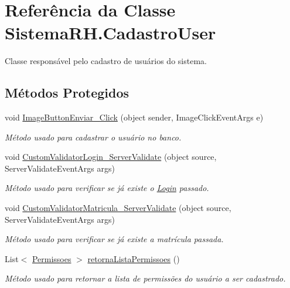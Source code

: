 \hypertarget{class_sistema_r_h_1_1_cadastro_user}{
\section{Referência da Classe SistemaRH.CadastroUser}
\label{class_sistema_r_h_1_1_cadastro_user}
}


Classe responsável pelo cadastro de usuários do sistema.  


\subsection*{Métodos Protegidos}
\begin{DoxyCompactItemize}
\item 
void \hyperlink{class_sistema_r_h_1_1_cadastro_user_aa3f1da03cef7548e855d0a578f01cf00}{ImageButtonEnviar\_\-Click} (object sender, ImageClickEventArgs e)
\begin{DoxyCompactList}\small\item\em Método usado para cadastrar o usuário no banco. \item\end{DoxyCompactList}\item 
void \hyperlink{class_sistema_r_h_1_1_cadastro_user_afeaa30d0a9edc0995bbbcda853789d7a}{CustomValidatorLogin\_\-ServerValidate} (object source, ServerValidateEventArgs args)
\begin{DoxyCompactList}\small\item\em Método usado para verificar se já existe o \hyperlink{class_sistema_r_h_1_1_login}{Login} passado. \item\end{DoxyCompactList}\item 
void \hyperlink{class_sistema_r_h_1_1_cadastro_user_ad526a607459146ee16c66c51445c6125}{CustomValidatorMatricula\_\-ServerValidate} (object source, ServerValidateEventArgs args)
\begin{DoxyCompactList}\small\item\em Método usado para verificar se já existe a matrícula passada. \item\end{DoxyCompactList}\item 
List$<$ \hyperlink{class_sistema_r_h_1_1_permissoes}{Permissoes} $>$ \hyperlink{class_sistema_r_h_1_1_cadastro_user_a0f0cc591384ee169a503a3f6e11606f3}{retornaListaPermissoes} ()
\begin{DoxyCompactList}\small\item\em Método usado para retornar a lista de permissões do usuário a ser cadastrado. \item\end{DoxyCompactList}\end{DoxyCompactItemize}
